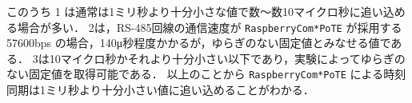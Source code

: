 このうち 1 は通常は1ミリ秒より十分小さな値で数〜数10マイクロ秒に追い込める場合が多い．
2は，RS-485回線の通信速度が {\tt Raspberry\-Com*PoTE} が採用する 57600bps の場合，140μ秒程度かかるが，ゆらぎのない固定値とみなせる値である．
3は10マイクロ秒かそれより十分小さい以下であり，実験によってゆらぎのない固定値を取得可能である．
以上のことから {\tt Raspberry\-Com*PoTE} による時刻同期は1ミリ秒より十分小さい値に追い込めることがわかる．


